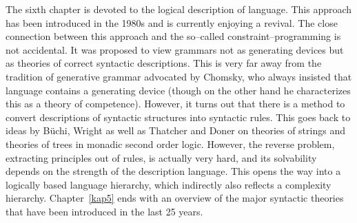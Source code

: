 The sixth chapter is devoted to the logical description of language. 
This approach has been introduced in the 1980s and is currently 
enjoying a revival. The close connection between this approach and
the so--called constraint--programming is not accidental. It was 
proposed to view grammars not as generating devices but as theories 
of correct syntactic descriptions.  This is very far away from the 
tradition of generative grammar advocated by Chomsky, 
who always insisted that language contains a generating device (though 
on the other hand he characterizes this as a theory of competence). 
However, it turns out that there is a method to convert descriptions 
of syntactic structures into syntactic rules. This goes back
to ideas by B\"uchi, 
Wright as well as Thatcher and Doner on theories of strings and 
theories of trees in monadic second order logic. However, the reverse 
problem, extracting principles out of rules, is actually very hard, 
and its solvability depends on the strength of the description
language. This opens the way into a logically based language
hierarchy, which indirectly also reflects a complexity
hierarchy. Chapter~\ref{kap5} ends with an overview of the
major syntactic theories that have been introduced in the
last 25 years.

